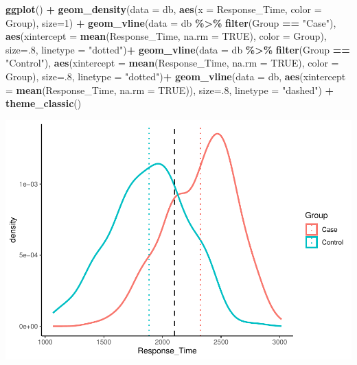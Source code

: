 \documentclass[
]{article}
\newenvironment{Shaded}{\begin{snugshade}}{\end{snugshade}}
\newcommand{\AttributeTok}[1]{\textcolor[rgb]{0.13,0.29,0.53}{#1}}
\newcommand{\ConstantTok}[1]{\textcolor[rgb]{0.56,0.35,0.01}{#1}}
\newcommand{\DecValTok}[1]{\textcolor[rgb]{0.00,0.00,0.81}{#1}}
\newcommand{\FunctionTok}[1]{\textcolor[rgb]{0.13,0.29,0.53}{\textbf{#1}}}
\newcommand{\NormalTok}[1]{#1}
\newcommand{\SpecialCharTok}[1]{\textcolor[rgb]{0.81,0.36,0.00}{\textbf{#1}}}
\newcommand{\StringTok}[1]{\textcolor[rgb]{0.31,0.60,0.02}{#1}}
\begin{document}
\begin{Shaded}
\begin{Highlighting}[]
\FunctionTok{ggplot}\NormalTok{()  }\SpecialCharTok{+}
  \FunctionTok{geom\_density}\NormalTok{(}\AttributeTok{data =}\NormalTok{ db,}
               \FunctionTok{aes}\NormalTok{(}\AttributeTok{x =}\NormalTok{ Response\_Time, }\AttributeTok{color =}\NormalTok{ Group), }\AttributeTok{size=}\DecValTok{1}\NormalTok{) }\SpecialCharTok{+}
  \FunctionTok{geom\_vline}\NormalTok{(}\AttributeTok{data =}\NormalTok{ db }\SpecialCharTok{\%\textgreater{}\%} \FunctionTok{filter}\NormalTok{(Group }\SpecialCharTok{==} \StringTok{"Case"}\NormalTok{), }
             \FunctionTok{aes}\NormalTok{(}\AttributeTok{xintercept =} \FunctionTok{mean}\NormalTok{(Response\_Time, }\AttributeTok{na.rm =} \ConstantTok{TRUE}\NormalTok{), }
                 \AttributeTok{color =}\NormalTok{ Group), }\AttributeTok{size=}\NormalTok{.}\DecValTok{8}\NormalTok{, }\AttributeTok{linetype =} \StringTok{"dotted"}\NormalTok{)}\SpecialCharTok{+}
  \FunctionTok{geom\_vline}\NormalTok{(}\AttributeTok{data =}\NormalTok{ db }\SpecialCharTok{\%\textgreater{}\%} \FunctionTok{filter}\NormalTok{(Group }\SpecialCharTok{==} \StringTok{"Control"}\NormalTok{), }
             \FunctionTok{aes}\NormalTok{(}\AttributeTok{xintercept =} \FunctionTok{mean}\NormalTok{(Response\_Time, }\AttributeTok{na.rm =} \ConstantTok{TRUE}\NormalTok{), }
                 \AttributeTok{color =}\NormalTok{ Group), }\AttributeTok{size=}\NormalTok{.}\DecValTok{8}\NormalTok{, }\AttributeTok{linetype =} \StringTok{"dotted"}\NormalTok{)}\SpecialCharTok{+}
  \FunctionTok{geom\_vline}\NormalTok{(}\AttributeTok{data =}\NormalTok{ db, }
             \FunctionTok{aes}\NormalTok{(}\AttributeTok{xintercept =} \FunctionTok{mean}\NormalTok{(Response\_Time, }\AttributeTok{na.rm =} \ConstantTok{TRUE}\NormalTok{)), }\AttributeTok{size=}\NormalTok{.}\DecValTok{8}\NormalTok{, }\AttributeTok{linetype =} \StringTok{"dashed"}\NormalTok{) }\SpecialCharTok{+}
    \FunctionTok{theme\_classic}\NormalTok{()}
\end{Highlighting}
\end{Shaded}

\includegraphics{Simulated_example_files/figure-latex/unnamed-chunk-13-1.pdf}
\end{document}
